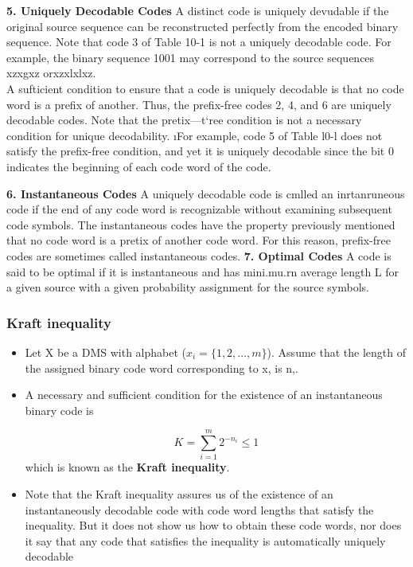 \documentclass[a4]{beamer}
\begin{document}
\begin{frame}
\textbf{5. Uniquely Decodable Codes}
A distinct code is uniquely devudable if the original source sequence can be reconstructed perfectly
from the encoded binary sequence. Note that code 3 of Table 10-1 is not a uniquely decodable code.
For example, the binary sequence 1001 may correspond to the source sequences xzxgxz orxzxlxlxz.
\\ \bigskip
A sufticient condition to ensure that a code is uniquely decodable is that no code word is a prefix of
another. Thus, the prefix-free codes 2, 4, and 6 are uniquely decodable codes. Note that the pretix—t`ree
condition is not a necessary condition for unique decodability. \i\bigskip For example, code 5 of Table l0-l does
not satisfy the prefix-free condition, and yet it is uniquely decodable since the bit 0 indicates the
beginning of each code word of the code.
\end{frame}
\begin{frame}
\textbf{6. Instantaneous Codes}
A uniquely decodable code is cmlled an inrtanruneous code if the end of any code word is
recognizable without examining subsequent code symbols. The instantaneous codes have the property
previously mentioned that no code word is a pretix of another code word. For this reason, prefix-free
codes are sometimes called instantaneous codes.
\textbf{7. Optimal Codes}
A code is said to be optimal if it is instantaneous and has mini.mu.rn average length L for a given
source with a given probability assignment for the source symbols.
\end{frame}
\begin{frame}
\frametitle{ Kraft inequality}
\begin{itemize}
\item Let X be a DMS with alphabet ($x _i = \{1, 2, . . . ,m\}$). Assume that the length of the assigned binary
code word corresponding to x, is n,.
\item A necessary and sufficient condition for the existence of an instantaneous binary code is
 
 \[ K = \sum^{m}_{i=1}2^{-n_i} \leq 1 \]
which is known as the \textbf{Kraft inequality}.
\item Note that the Kraft inequality assures us of the existence of an instantaneously decodable code
with code word lengths that satisfy the inequality. But it does not show us how to obtain these code
words, nor does it say that any code that satisfies the inequality is automatically uniquely decodable
\end{itemize}
\end{frame}
\end{document}
